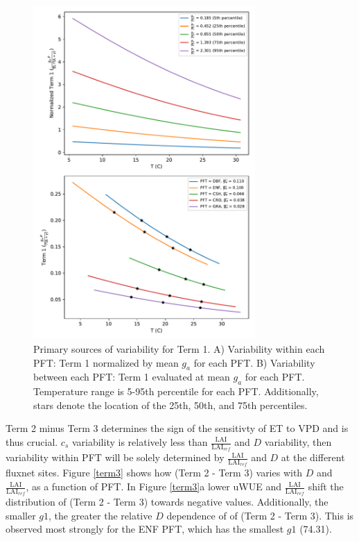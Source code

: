 \documentclass[draft,linenumbers]{agujournal}
\begin{document}
\begin{figure}[h]
\centering
\includegraphics[width=20pc]{./fig04.pdf}
\caption{Primary sources of variability for Term 1. A) Variability within each PFT: Term 1 normalized by mean $g_a$ for each PFT. B) Variability between each PFT: Term 1 evaluated at mean $g_a$ for each PFT. Temperature range is 5-95th percentile for each PFT. Additionally, stars denote the location of the 25th, 50th, and 75th percentiles.}
\label{scale_vary}
\end{figure}


Term 2 minus Term 3 determines the sign of the sensitivty of ET to VPD and is thus crucial. $c_s$ variability is relatively less than $\frac{\text{LAI}}{\text{LAI$_{ref}$}}$ and $D$ variability, then variability within PFT will be solely determined by $\frac{\text{LAI}}{\text{LAI$_{ref}$}}$ and $D$ at the different fluxnet sites. Figure \ref{term3} shows how (Term 2 - Term 3) varies with $D$ and $\frac{\text{LAI}}{\text{LAI$_{ref}$}}$, as a function of PFT. In Figure \ref{term3}a lower uWUE and $\frac{\text{LAI}}{\text{LAI$_{ref}$}}$ shift the distribution of (Term 2 - Term 3) towards negative values. Additionally, the smaller $g1$, the greater the relative $D$ dependence of of (Term 2 - Term 3). This is observed most strongly for the ENF PFT, which has the smallest $g1$ (74.31). 
\end{document}
